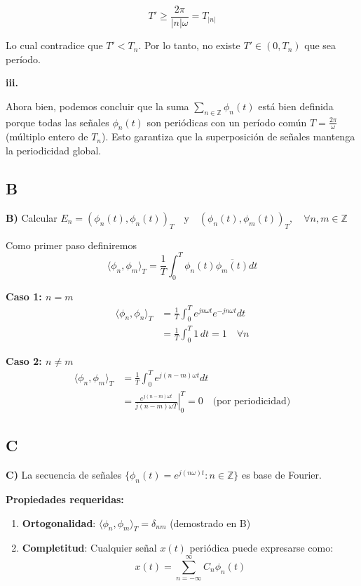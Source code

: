 $$T' \ge \dfrac{2\pi}{|n|\omega} = T_{|n|}$$

Lo cual contradice que $T'<T_n$. Por lo tanto, no existe $T'\in(0,T_n)$ que sea per\'iodo.

\textbf{iii.}

Ahora bien, podemos concluir que la suma $\sum_{n \in \mathbb{Z}} \phi_n(t)$ está bien definida porque todas las señales $\phi_n(t)$ son peri\'odicas con un per\'iodo común $T = \frac{2\pi}{\omega}$ (múltiplo entero de $T_n$). Esto garantiza que la superposición de señales mantenga la periodicidad global.

\vspace{0.5cm}

\subsection{B}

\textbf{B)} Calcular $E_n = (\phi_n(t), \phi_n(t))_T \quad \text{y} \quad (\phi_n(t), \phi_m(t))_T, \quad \forall n,m \in \mathbb{Z}$

Como primer paso definiremos
\[
\langle \phi_n, \phi_m \rangle_T = \frac{1}{T}\int_0^T \phi_n(t)\overline{\phi_m(t)}dt
\]

\textbf{Caso 1: $n = m$}
\begin{align*}
\langle \phi_n, \phi_n \rangle_T &= \frac{1}{T}\int_0^T e^{jn\omega t}e^{-jn\omega t}dt \\
&= \frac{1}{T}\int_0^T 1\,dt = 1 \quad \forall n
\end{align*}

\textbf{Caso 2: $n \neq m$}
\begin{align*}
\langle \phi_n, \phi_m \rangle_T &= \frac{1}{T}\int_0^T e^{j(n-m)\omega t}dt \\
&= \left.\frac{e^{j(n-m)\omega t}}{j(n-m)\omega T}\right|_0^T = 0 \quad \text{(por periodicidad)}
\end{align*}

\vspace{0.5cm}

\subsection{C}

\textbf{C)} La secuencia de señales $\{ \phi_n(t) = e^{j(n\omega)t} : n \in \mathbb{Z} \}$ es base de Fourier.

\textbf{Propiedades requeridas:}
\begin{enumerate}[label=(\roman*)]
\item \textbf{Ortogonalidad}: $\langle \phi_n, \phi_m \rangle_T = \delta_{nm}$ (demostrado en B)
\item \textbf{Completitud}: Cualquier señal $x(t)$ periódica puede expresarse como:
\[
x(t) = \sum_{n=-\infty}^{\infty} C_n \phi_n(t)
\]
\end{enumerate}

